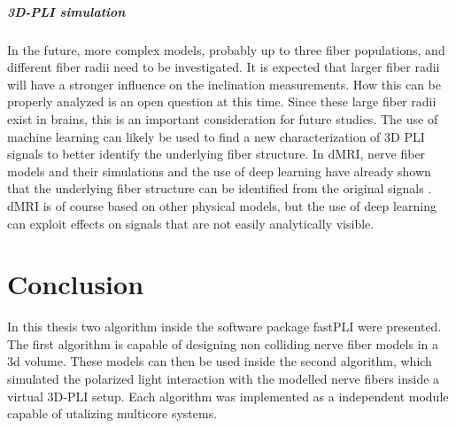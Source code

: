 \paragraph{\ac{3D-PLI} simulation}
% 
In the future, more complex models, probably up to three fiber populations, and different fiber radii need to be investigated.
It is expected that larger fiber radii will have a stronger influence on the inclination measurements.
How this can be properly analyzed is an open question at this time.
Since these large fiber radii exist in brains, this is an important consideration for future studies.
The use of machine learning can likely be used to find a new characterization of 3D PLI signals to better identify the underlying fiber structure.
In \ac{dMRI}, nerve fiber models and their simulations and the use of deep learning have already shown that the underlying fiber structure can be identified from the original signals \cite{ginsburgerDis2019}.
\ac{dMRI} is of course based on other physical models, but the use of deep learning can exploit effects on signals that are not easily analytically visible.
% 
% 
% 
% 
% 
\chapter{Conclusion}
\label{sec:conclusion}
% 
In this thesis two algorithm inside the software package \ac{fastPLI} were presented.
The first algorithm is capable of designing non colliding nerve fiber models in a 3d volume.
These models can then be used inside the second algorithm, which simulated the polarized light interaction with the modelled nerve fibers inside a virtual \ac{3D-PLI} setup.
Each algorithm was implemented as a independent \python{} module capable of utalizing multicore systems.
% 
